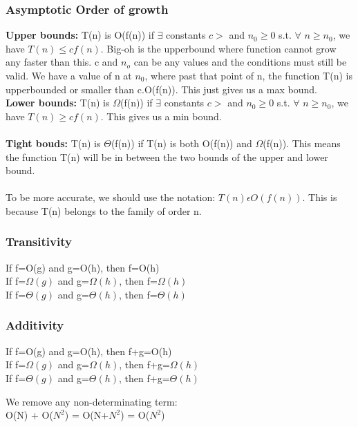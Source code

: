 \documentclass[11pt, oneside]{article}
\theoremstyle{definition}
\begin{document}
\subsubsection{Asymptotic Order of growth}
\textbf{Upper bounds:} T(n) is O(f(n)) if $\exists$ constants $c > $ and $n_0 \geq 0$ s.t. $\forall$ $n\geq n_0$, we have $T(n)\leq cf(n)$. Big-oh is the upperbound where function cannot grow any faster than this. c and $n_o$ can be any values and the conditions must still be valid. We have a value of n at $n_0$, where past that point of n, the function T(n) is upperbounded or smaller than c.O(f(n)). This just gives us a max bound.\\
\textbf{Lower bounds:} T(n) is $\Omega$(f(n)) if $\exists$ constants $c > $ and $n_0 \geq 0$ s.t. $\forall$ $n \geq n_0$, we have $T(n) \geq cf(n)$. This gives us a min bound.\\\\
\textbf{Tight bouds:} T(n) is $\Theta$(f(n)) if T(n) is both O(f(n)) and $\Omega$(f(n)). This means the function T(n) will be in between the two bounds of the upper and lower bound. \\\\
To be more accurate, we should use the notation: $T(n) \epsilon O(f(n))$. This is because T(n) belongs to the family of order n.\\

\subsubsection{Transitivity}
\begin{center}
If f=O(g) and g=O(h), then f=O(h)\\
If f=$\Omega(g)$ and g=$\Omega(h)$, then f=$\Omega(h)$\\
If f=$\Theta(g)$ and g=$\Theta(h)$, then f=$\Theta(h)$\\
\end{center}
\subsubsection{Additivity}
\begin{center}
If f=O(g) and g=O(h), then f+g=O(h)\\
If f=$\Omega(g)$ and g=$\Omega(h)$, then f+g=$\Omega(h)$\\
If f=$\Theta(g)$ and g=$\Theta(h)$, then f+g=$\Theta(h)$\\
\end{center}
We remove any non-determinating term:\\
O(N) + O($N^2$) = O(N+$N^2$) = O($N^2$)\\
\end{document}
